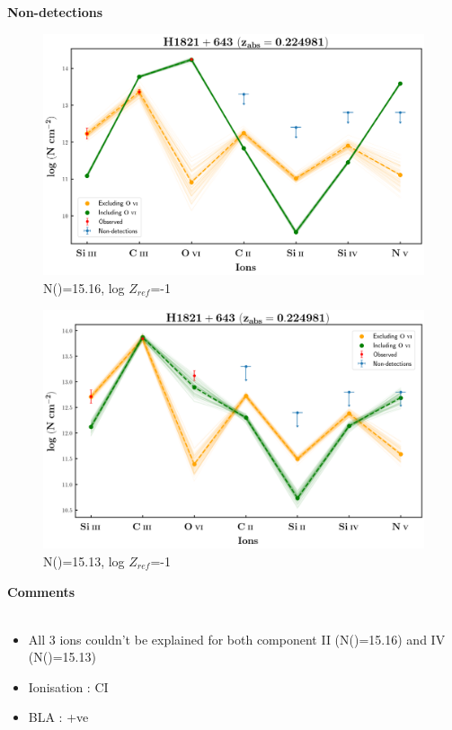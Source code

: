 \documentclass[12pt]{report}
\newcommand\ion[2]{\text{#1\,\textsc{\lowercase{#2}}}}
\begin{document}
\newpage

\textbf{Non-detections}

\begin{figure}[!h]
    \centering
    \includegraphics[width=0.8\linewidth]{Ionisation-Modelling-Plots/h1821-z=0.224981-compII_logZ=-1_non_detection.png}
    \caption{N(\ion{H}{i})=15.16, log $Z_{ref}$=-1}
\end{figure}

\begin{figure}[!h]
    \centering
    \includegraphics[width=0.8\linewidth]{Ionisation-Modelling-Plots/h1821-z=0.224981-compIV_logZ=-1_non_detection.png}
    \caption{N(\ion{H}{i})=15.13, log $Z_{ref}$=-1}
\end{figure}




\newpage

\textbf{Comments}
\\\\
\begin{itemize}
    \item All 3 ions couldn't be explained for both component II (N(\ion{H}{i})=15.16) and IV (N(\ion{H}{i})=15.13)
    \item Ionisation : CI
    \item BLA : +ve
\end{itemize}
\end{document}
